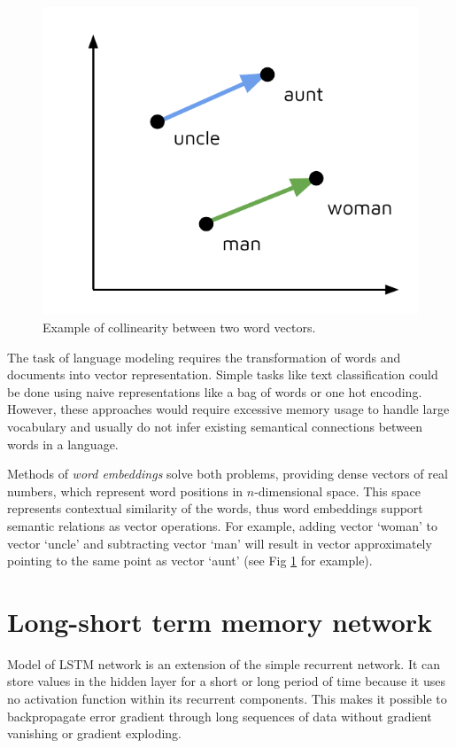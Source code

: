 \begin{figure}[h]
\centering
\includegraphics{Figures/word_embeddings}
\decoRule
\caption[Word vectors]{Example of collinearity between two word vectors.}
\label{fig:word_embeddings}
\end{figure}

The task of language modeling requires the transformation of words and documents into vector representation. Simple tasks like text classification could be done using naive representations like a bag of words or one hot encoding. However, these approaches would require excessive memory usage to handle large vocabulary and usually do not infer existing semantical connections between words in a language. 



Methods of \emph{word embeddings} solve both problems, providing dense vectors of real numbers, which represent word positions in $n$-dimensional space. This space represents contextual similarity of the words, thus word embeddings support semantic relations as vector operations. For example, adding vector ‘woman’ to vector ‘uncle’ and subtracting vector ‘man’ will result in vector approximately pointing to the same point as vector ‘aunt’ (see Fig \ref{fig:word_embeddings} for example).

\section{Long-short term memory network}
Model of LSTM network is an extension of the simple recurrent network. It can store values in the hidden layer for a short or long period of time because it uses no activation function within its recurrent components. This makes it possible to backpropagate error gradient through long sequences of data without gradient vanishing or gradient exploding.

